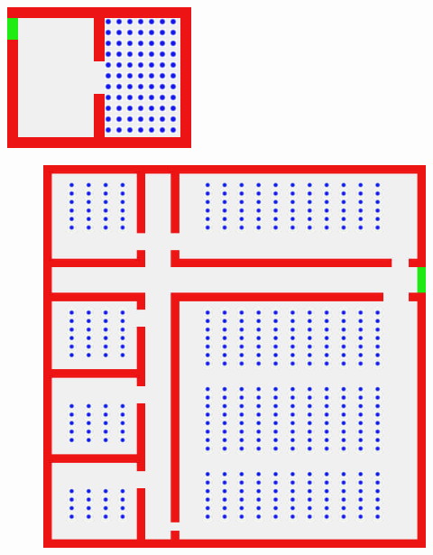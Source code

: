 \begin{titlepage}
\begin{center}

\includegraphics[width=.35\textwidth]{./titre/SimFoule0104}
\label{fig:image1}
~\\[1cm]

\begin{figure}[htbp]
\begin{minipage}[c]{.45\linewidth}
\begin{center}
\includegraphics[scale=0.35]{./titre/SimFoule0103}
\end{center}
\end{minipage}
\hfill
\begin{minipage}[c]{.45\linewidth}
\begin{center}

\end{center}
\end{minipage}
\end{figure}
\end{center}
\end{titlepage}
